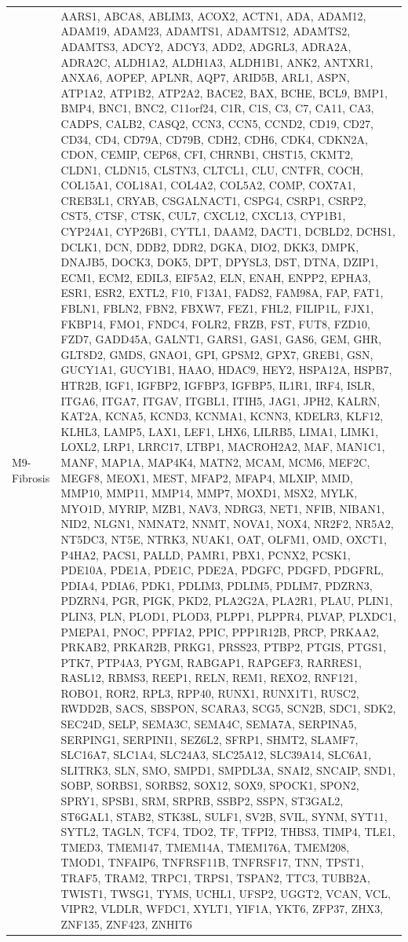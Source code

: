\documentclass[
]{article}
\begin{document}
\begin{singlespace}
\begin{longtable}[t]{>{\raggedright\arraybackslash}p{1in}>{\raggedright\arraybackslash}p{5in}}
\addlinespace
M9-Fibrosis & AARS1, ABCA8, ABLIM3, ACOX2, ACTN1, ADA, ADAM12, ADAM19, ADAM23, ADAMTS1, ADAMTS12, ADAMTS2, ADAMTS3, ADCY2, ADCY3, ADD2, ADGRL3, ADRA2A, ADRA2C, ALDH1A2, ALDH1A3, ALDH1B1, ANK2, ANTXR1, ANXA6, AOPEP, APLNR, AQP7, ARID5B, ARL1, ASPN, ATP1A2, ATP1B2, ATP2A2, BACE2, BAX, BCHE, BCL9, BMP1, BMP4, BNC1, BNC2, C11orf24, C1R, C1S, C3, C7, CA11, CA3, CADPS, CALB2, CASQ2, CCN3, CCN5, CCND2, CD19, CD27, CD34, CD4, CD79A, CD79B, CDH2, CDH6, CDK4, CDKN2A, CDON, CEMIP, CEP68, CFI, CHRNB1, CHST15, CKMT2, CLDN1, CLDN15, CLSTN3, CLTCL1, CLU, CNTFR, COCH, COL15A1, COL18A1, COL4A2, COL5A2, COMP, COX7A1, CREB3L1, CRYAB, CSGALNACT1, CSPG4, CSRP1, CSRP2, CST5, CTSF, CTSK, CUL7, CXCL12, CXCL13, CYP1B1, CYP24A1, CYP26B1, CYTL1, DAAM2, DACT1, DCBLD2, DCHS1, DCLK1, DCN, DDB2, DDR2, DGKA, DIO2, DKK3, DMPK, DNAJB5, DOCK3, DOK5, DPT, DPYSL3, DST, DTNA, DZIP1, ECM1, ECM2, EDIL3, EIF5A2, ELN, ENAH, ENPP2, EPHA3, ESR1, ESR2, EXTL2, F10, F13A1, FADS2, FAM98A, FAP, FAT1, FBLN1, FBLN2, FBN2, FBXW7, FEZ1, FHL2, FILIP1L, FJX1, FKBP14, FMO1, FNDC4, FOLR2, FRZB, FST, FUT8, FZD10, FZD7, GADD45A, GALNT1, GARS1, GAS1, GAS6, GEM, GHR, GLT8D2, GMDS, GNAO1, GPI, GPSM2, GPX7, GREB1, GSN, GUCY1A1, GUCY1B1, HAAO, HDAC9, HEY2, HSPA12A, HSPB7, HTR2B, IGF1, IGFBP2, IGFBP3, IGFBP5, IL1R1, IRF4, ISLR, ITGA6, ITGA7, ITGAV, ITGBL1, ITIH5, JAG1, JPH2, KALRN, KAT2A, KCNA5, KCND3, KCNMA1, KCNN3, KDELR3, KLF12, KLHL3, LAMP5, LAX1, LEF1, LHX6, LILRB5, LIMA1, LIMK1, LOXL2, LRP1, LRRC17, LTBP1, MACROH2A2, MAF, MAN1C1, MANF, MAP1A, MAP4K4, MATN2, MCAM, MCM6, MEF2C, MEGF8, MEOX1, MEST, MFAP2, MFAP4, MLXIP, MMD, MMP10, MMP11, MMP14, MMP7, MOXD1, MSX2, MYLK, MYO1D, MYRIP, MZB1, NAV3, NDRG3, NET1, NFIB, NIBAN1, NID2, NLGN1, NMNAT2, NNMT, NOVA1, NOX4, NR2F2, NR5A2, NT5DC3, NT5E, NTRK3, NUAK1, OAT, OLFM1, OMD, OXCT1, P4HA2, PACS1, PALLD, PAMR1, PBX1, PCNX2, PCSK1, PDE10A, PDE1A, PDE1C, PDE2A, PDGFC, PDGFD, PDGFRL, PDIA4, PDIA6, PDK1, PDLIM3, PDLIM5, PDLIM7, PDZRN3, PDZRN4, PGR, PIGK, PKD2, PLA2G2A, PLA2R1, PLAU, PLIN1, PLIN3, PLN, PLOD1, PLOD3, PLPP1, PLPPR4, PLVAP, PLXDC1, PMEPA1, PNOC, PPFIA2, PPIC, PPP1R12B, PRCP, PRKAA2, PRKAB2, PRKAR2B, PRKG1, PRSS23, PTBP2, PTGIS, PTGS1, PTK7, PTP4A3, PYGM, RABGAP1, RAPGEF3, RARRES1, RASL12, RBMS3, REEP1, RELN, REM1, REXO2, RNF121, ROBO1, ROR2, RPL3, RPP40, RUNX1, RUNX1T1, RUSC2, RWDD2B, SACS, SBSPON, SCARA3, SCG5, SCN2B, SDC1, SDK2, SEC24D, SELP, SEMA3C, SEMA4C, SEMA7A, SERPINA5, SERPING1, SERPINI1, SEZ6L2, SFRP1, SHMT2, SLAMF7, SLC16A7, SLC1A4, SLC24A3, SLC25A12, SLC39A14, SLC6A1, SLITRK3, SLN, SMO, SMPD1, SMPDL3A, SNAI2, SNCAIP, SND1, SOBP, SORBS1, SORBS2, SOX12, SOX9, SPOCK1, SPON2, SPRY1, SPSB1, SRM, SRPRB, SSBP2, SSPN, ST3GAL2, ST6GAL1, STAB2, STK38L, SULF1, SV2B, SVIL, SYNM, SYT11, SYTL2, TAGLN, TCF4, TDO2, TF, TFPI2, THBS3, TIMP4, TLE1, TMED3, TMEM147, TMEM14A, TMEM176A, TMEM208, TMOD1, TNFAIP6, TNFRSF11B, TNFRSF17, TNN, TPST1, TRAF5, TRAM2, TRPC1, TRPS1, TSPAN2, TTC3, TUBB2A, TWIST1, TWSG1, TYMS, UCHL1, UFSP2, UGGT2, VCAN, VCL, VIPR2, VLDLR, WFDC1, XYLT1, YIF1A, YKT6, ZFP37, ZHX3, ZNF135, ZNF423, ZNHIT6\\

\end{longtable}
\end{singlespace}
\end{document}
